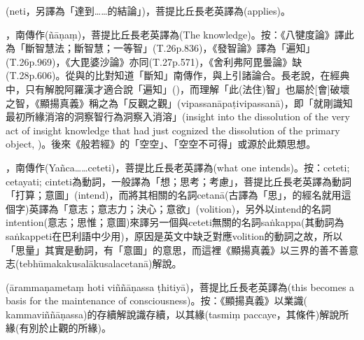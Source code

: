 \startitemgroup[noteitems]
\item{}(neti，另譯為「達到……的結論」)，菩提比丘長老英譯為(applies)。
\stopitemgroup

\startitemgroup[noteitems]
\item{}，南傳作(ñāṇaṃ)，菩提比丘長老英譯為(The knowledge)。按：《八犍度論》譯此為「斷智慧法；斷智慧；一等智」(T.26p.836)，《發智論》譯為「遍知」(T.26p.969)，《大毘婆沙論》亦同(T.27p.571)，《舍利弗阿毘曇論》缺(T.28p.606)。從與的比對知道「斷知」南傳作，與上引諸論合。長老說，在經典中，只有解脫阿羅漢才適合說「遍知」()，而理解「此(法住)智」也屬於[會]破壞之智，《顯揚真義》稱之為「反觀之觀」(vipassanāpaṭivipassanā)，即「就剛識知最初所緣消溶的洞察智行為洞察入消溶」(insight into the dissolution of the very act of insight knowledge that had just cognized the dissolution of the primary object, )。後來《般若經》的「空空」、「空空不可得」或源於此類思想。
\stopitemgroup

\startitemgroup[noteitems]
\item{}，南傳作(Yañca……ceteti)，菩提比丘長老英譯為(what one intends)。按：ceteti; cetayati; cinteti為動詞，一般譯為「想；思考；考慮」，菩提比丘長老英譯為動詞「打算；意圖」(intend)，而將其相關的名詞cetanā(古譯為「思」，的經名就用這個字)英譯為「意志；意志力；決心；意欲」(volition)，另外以intend的名詞intention(意志；思惟；意圖)來譯另一個與ceteti無關的名詞saṅkappa(其動詞為saṅkappeti在巴利語中少用)，原因是英文中缺乏對應volition的動詞之故，所以「思量」其實是動詞，有「意圖」的意思，而這裡《顯揚真義》以三界的善不善意志(tebhūmakakusalākusalacetanā)解說。
\stopitemgroup

\startitemgroup[noteitems]
\item{}(ārammaṇametaṃ hoti viññāṇassa ṭhitiyā)，菩提比丘長老英譯為(this becomes a basis for the maintenance of consciousness)。按：《顯揚真義》以業識( kammaviññāṇassa)的存續解說識存續，以其緣(tasmiṃ paccaye，其條件)解說所緣(有別於止觀的所緣)。
\stopitemgroup

